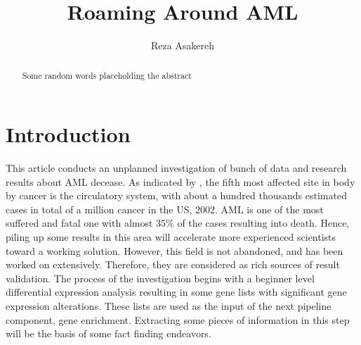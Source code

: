 \documentclass[3p,authoryear,preprint,12pt]{elsarticle}
\begin{document}
\begin{frontmatter}
	
\title{Roaming Around AML
}
    
\author[abb6a21433054]{Reza Asakereh}
    
\address[abb6a21433054]{CE Department\unskip, 
    Sharif University of Technology}
  

\begin{abstract}
 Some random words placeholding the abstract%
\end{abstract}
\end{frontmatter}
    
\section{Introduction}
 This article conducts an unplanned investigation of bunch of data and research results about AML decease. As indicated by \cite{doi:10.3322/canjclin.55.2.74}, the fifth most affected site in body by cancer is the circulatory system, with about a hundred thousands estimated cases in total of a million cancer in the US, 2002. AML is one of the most suffered and fatal one with almost 35\% of the cases resulting into death. Hence, piling up some results in this area will accelerate more experienced scientists toward a working solution. However, this field is not abandoned, and has been worked on extensively. Therefore, they are considered as rich sources of result validation. The process of the investigation begins with a beginner level differential expression analysis resulting in some gene lists with significant gene expression alterations. These lists are used as the input of the next pipeline component, gene enrichment. Extracting some pieces of information in this step will be the basis of some fact finding endeavors.
\end{document}

